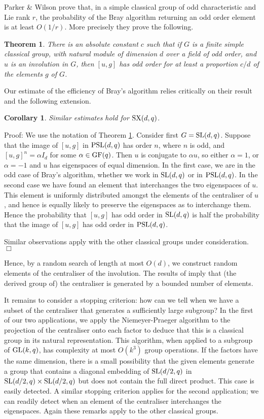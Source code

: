 \documentclass[12pt]{article}
\newtheorem{theorem}[definition]{Theorem}
\newtheorem{corollary}[definition]{Corollary}
\newenvironment{proof}{\normalsize {\sc Proof}:}{{\hfill $\Box$ \\}}
\def\SL{{\rm SL}}
\def\GL{{\rm GL}}
\def\PSL{{\rm PSL}}
\def\GF{{\rm GF}}
\def\SX{{\rm SX}}
\begin{document}
Parker \& Wilson \cite{PW05} prove that,
in a simple classical group of odd characteristic and Lie rank $r$, 
the probability of the Bray algorithm returning an odd 
order element is at least $O(1/r)$. 
More precisely they prove the following.
\begin{theorem}\label{clasthm}
There is an absolute constant $c$ such that if $G$ is a finite
simple classical group, with natural module
of dimension $d$ over a field of odd order,
and $u$ is an involution in $G$, then $[u,g]$ has odd order
for at least a proportion $c/d$ of the elements $g$ of $G$.
\end{theorem}

Our estimate of the efficiency of Bray's algorithm relies critically 
on their result and the following extension. 
\begin{corollary}
Similar estimates hold for $\SX(d, q)$.
\end{corollary}
\begin{proof}
We use the notation of Theorem \ref{clasthm}.
Consider first $G=\SL(d,q)$. 
Suppose that the image of $[u,g]$ in $\PSL(d,q)$ has
order $n$, where $n$ is odd, and $[u,g]^n=\alpha I_d$ for
some $\alpha\in\GF(q)$. Then $u$ is conjugate to $\alpha u$, so
either $\alpha=1$, or $\alpha=-1$ and $u$  has eigenspaces of equal dimension.
In the first case, we are in the odd case of  Bray's algorithm,
whether we work in $\SL(d,q)$ or in $\PSL(d,q)$. In the second case
we have found an element that interchanges the two eigenspaces of
$u$.   This element is uniformly distributed amongst the elements of the
centraliser of $u$, and hence is equally likely to preserve the eigenspaces as to
interchange them.  Hence the probability that $[u,g]$ has odd order in $\SL(d,q)$
is half the probability that the image of $[u,g]$ has odd order in $\PSL(d,q)$.

Similar observations apply with the other classical groups under consideration.
\end{proof}

Hence, by a random search of length at most $O(d)$, we construct
random elements of the centraliser of the involution. The results of 
\cite{lish} imply that (the derived group of) the centraliser is generated 
by a bounded number of elements. 

It remains to consider a stopping criterion: how can we tell when we
have a subset of the centraliser that generates a sufficiently large
subgroup?  In the first of our two applications, 
we apply the Niemeyer-Praeger algorithm \cite{NP} to 
the projection of the centraliser onto
each factor to deduce that this 
is a classical group in its natural representation.
This algorithm, when applied to a subgroup of $\GL(k,q)$,
has complexity at most $O(k^3)$ group operations. If the factors have the
same dimension, there is a small possibility that the given elements
generate a group that contains a diagonal embedding of $\SL(d/2,q)$
in $\SL(d/2,q)\times\SL(d/2,q)$ but does not contain the full direct product.
This case is easily detected. A similar stopping criterion applies for the
second application; we can readily detect when an element
of the centraliser interchanges the eigenspaces.
Again these remarks apply to the other classical groups.
\end{document}
